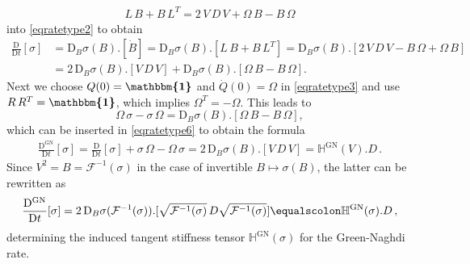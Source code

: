 \documentclass[10pt]{article}
\newcounter{theoremCounter}
\numberwithin{theoremCounter}{section}
\theoremstyle{plain}
\theoremstyle{definition}
\newtheorem{example}[theoremCounter]{Example}
\newcommand{\red}[1]{{\color{red}#1}}
\newcommand{\id}{{\boldsymbol{\mathbbm{1}}}}
\newcommand{\DD}{\mathrm{D}}
\DeclareMathOperator{\GN}{GN}
\def\H{\mathbb{H}}
\numberwithin{equation}{section}
\begin{document}
	\begin{align}
	L \, B + B \, L^T = 2 \, V \, D \, V + \Omega \, B - B \, \Omega
	\end{align}
into \eqref{eqratetype2} to obtain
	\begin{equation}
	\label{eqratetype6}
	\begin{alignedat}{2}
	\frac{\DD}{\DD t}[\sigma] &= \DD_B\sigma(B).[\dot B] = \DD_B\sigma(B).[L \, B + B \, L^T] = \DD_B\sigma(B).[2 \, V \, D \, V - B \, \Omega + \Omega \, B] \\
	&= 2 \, \DD_B\sigma(B).[V \, D \, V] + \DD_B\sigma(B).[\Omega \, B - B \, \Omega].
	\end{alignedat}
	\end{equation}
Next we choose $Q(0) = \id$ and $\dot{Q}(0) = \Omega$ in \eqref{eqratetype3} and use $R \, R^T = \id$, which implies $\Omega^T = - \Omega$. This leads to
	\begin{equation}
	\boxed{\Omega \, \sigma - \sigma \, \Omega = \DD_B\sigma(B).[\Omega \, B - B \, \Omega],}
	\end{equation}
which can be inserted in \eqref{eqratetype6} to obtain the formula
	\begin{align}
	\label{eqrateGN01}
	\boxed{\frac{\DD^{\GN}}{\DD t}[\sigma] = \frac{\DD}{\DD t}[\sigma] + \sigma \, \Omega - \Omega \, \sigma = 2 \, \DD_B\sigma(B).[V \, D \, V] = \H^{\GN}(V).D \, .}
	\end{align}
Since $V^2 = B = \mathcal{F}^{-1}(\sigma)$ in the case of invertible $B \mapsto \sigma(B)$, the latter can be rewritten as
	\begin{align}
	\frac{\DD^{\GN}}{\DD t}[\sigma] = 2 \, \DD_B\sigma(\mathcal{F}^{-1}(\sigma)).[\sqrt{\mathcal{F}^{-1}(\sigma)} \, D \sqrt{\mathcal{F}^{-1}(\sigma)}] \equalscolon \H^{\textnormal{GN}}(\sigma).D \, ,
	\end{align}
determining the induced tangent stiffness tensor $\H^{\GN}(\sigma)$ for the Green-Naghdi rate.
%
%
%
%
%

\end{document}
